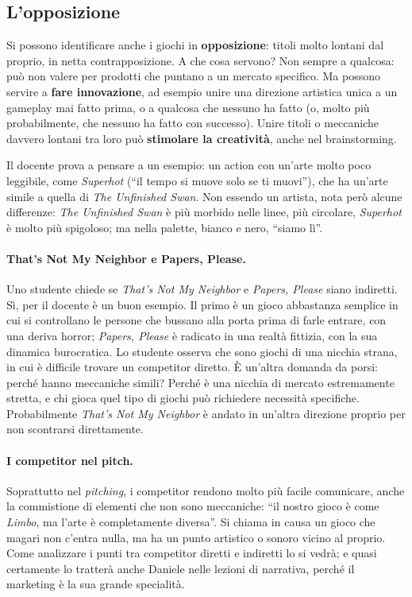 \subsection{L'opposizione}

Si possono identificare anche i giochi in \textbf{opposizione}: titoli molto
lontani dal proprio, in netta contrapposizione. A che cosa servono? Non sempre
a qualcosa: può non valere per prodotti che puntano a un mercato specifico. Ma
possono servire a \textbf{fare innovazione}, ad esempio unire una direzione
artistica unica a un gameplay mai fatto prima, o a qualcosa che nessuno ha
fatto (o, molto più probabilmente, che nessuno ha fatto con successo). Unire
titoli o meccaniche davvero lontani tra loro può \textbf{stimolare la
creatività}, anche nel brainstorming.

Il docente prova a pensare a un esempio: un action con un'arte molto poco
leggibile, come \emph{Superhot} (``il tempo si muove solo se ti muovi''), che
ha un'arte simile a quella di \emph{The Unfinished Swan}. Non essendo un
artista, nota però alcune differenze: \emph{The Unfinished Swan} è più
morbido nelle linee, più circolare, \emph{Superhot} è molto più spigoloso; ma
nella palette, bianco e nero, ``siamo lì''.

\paragraph{That's Not My Neighbor e Papers, Please.} Uno studente chiede se
\emph{That's Not My Neighbor} e \emph{Papers, Please} siano indiretti. Sì, per
il docente è un buon esempio. Il primo è un gioco abbastanza semplice in cui
si controllano le persone che bussano alla porta prima di farle entrare, con
una deriva horror; \emph{Papers, Please} è radicato in una realtà fittizia,
con la sua dinamica burocratica. Lo studente osserva che sono giochi di una
nicchia strana, in cui è difficile trovare un competitor diretto. È un'altra
domanda da porsi: perché hanno meccaniche simili? Perché è una nicchia di
mercato estremamente stretta, e chi gioca quel tipo di giochi può richiedere
necessità specifiche. Probabilmente \emph{That's Not My Neighbor} è andato in
un'altra direzione proprio per non scontrarsi direttamente.

\paragraph{I competitor nel pitch.} Soprattutto nel \emph{pitching}, i
competitor rendono molto più facile comunicare, anche la commistione di
elementi che non sono meccaniche: ``il nostro gioco è come \emph{Limbo}, ma
l'arte è completamente diversa''. Si chiama in causa un gioco che magari non
c'entra nulla, ma ha un punto artistico o sonoro vicino al proprio. Come
analizzare i punti tra competitor diretti e indiretti lo si vedrà; e quasi
certamente lo tratterà anche Daniele nelle lezioni di narrativa, perché il
marketing è la sua grande specialità.

